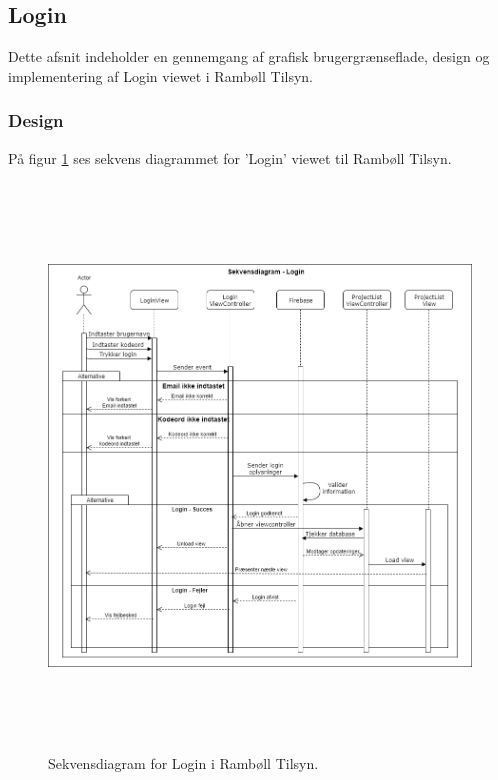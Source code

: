 \subsection{Login} \label{sec:Login}
Dette afsnit indeholder en gennemgang af grafisk brugergrænseflade, design og implementering af Login viewet i Rambøll Tilsyn.

\subsubsection{Design}
På figur \ref{fig:LoginSekvens} ses sekvens diagrammet for 'Login' viewet til Rambøll Tilsyn.
\begin{figure}[H] %
	\centering
	\includegraphics[height=15cm, width=15cm]{../ArkitekturDesign/Design/Login/LoginSekvensDiagram}
	\caption{Sekvensdiagram for Login i Rambøll Tilsyn.}
	\label{fig:LoginSekvens}
\end{figure}

\clearpage

